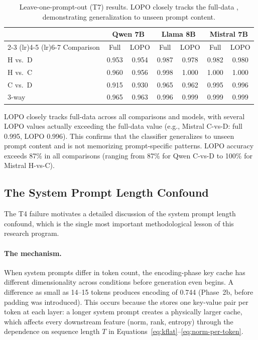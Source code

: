 \begin{table}[t]
  \centering
  \caption{Leave-one-prompt-out (T7) results.
  LOPO \auroc closely tracks the full-data \auroc, demonstrating generalization to unseen prompt content.}
  \label{tab:lopo}
  \begin{tabular}{@{}lcccccc@{}}
    \toprule
    & \multicolumn{2}{c}{Qwen 7B} & \multicolumn{2}{c}{Llama 8B} & \multicolumn{2}{c}{Mistral 7B} \\
    \cmidrule(lr){2-3} \cmidrule(lr){4-5} \cmidrule(lr){6-7}
    Comparison & Full & LOPO & Full & LOPO & Full & LOPO \\
    \midrule
    H vs.\ D    & 0.953 & 0.954 & 0.987 & 0.978 & 0.982 & 0.980 \\
    H vs.\ C    & 0.960 & 0.956 & 0.998 & 1.000 & 1.000 & 1.000 \\
    C vs.\ D    & 0.915 & 0.930 & 0.965 & 0.962 & 0.995 & 0.996 \\
    \midrule
    3-way       & 0.965 & 0.963 & 0.996 & 0.999 & 0.999 & 0.999 \\
    \bottomrule
  \end{tabular}
\end{table}

\noindent LOPO \auroc closely tracks full-data \auroc across all comparisons and models, with several LOPO values actually exceeding the full-data value (e.g., Mistral C-vs-D: full 0.995, LOPO 0.996).
This confirms that the classifier generalizes to unseen prompt content and is not memorizing prompt-specific patterns.
LOPO accuracy exceeds 87\% in all comparisons (ranging from 87\% for Qwen C-vs-D to 100\% for Mistral H-vs-C).

\subsection{The System Prompt Length Confound}
\label{sec:prompt_length_confound}

The T4 failure motivates a detailed discussion of the system prompt length confound, which is the single most important methodological lesson of this research program.

\paragraph{The mechanism.}
When system prompts differ in token count, the encoding-phase key cache has different dimensionality across conditions before generation even begins.
A difference as small as 14--15 tokens produces encoding \auroc of 0.744 (Phase~2b, before padding was introduced).
This occurs because the \kvcache stores one key-value pair per token at each layer: a longer system prompt creates a physically larger cache, which affects every downstream feature (norm, rank, entropy) through the dependence on sequence length $T$ in Equations~\ref{eq:kflat}--\ref{eq:norm-per-token}.

